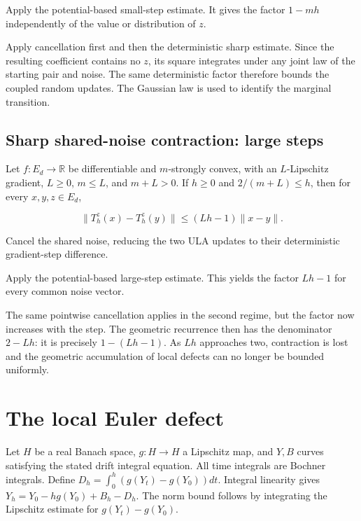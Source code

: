 \documentclass[11pt,a4paper]{report}
\begin{document}
Apply the potential-based small-step estimate. It gives the factor \(1-mh\) independently of the value or distribution of \(z\).



Apply cancellation first and then the deterministic sharp estimate. Since the resulting coefficient contains no \(z\), its square integrates under any joint law of the starting pair and noise. The same deterministic factor therefore bounds the coupled random updates. The Gaussian law is used to identify the marginal transition.

\subsection{\texorpdfstring{Sharp shared-noise contraction: large steps}{Sharp shared-noise contraction: large steps}}
\label{report-step-UnadjustedLangevin-SharpContraction-lean-11}


Let \(f:E_d\to\mathbb R\) be differentiable and \(m\)-strongly convex, with an \(L\)-Lipschitz gradient, \(L\ge0\), \(m\le L\), and \(m+L>0\). If \(h\ge0\) and \(2/(m+L)\le h\), then for every \(x,y,z\in E_d\),

\[\|T_h^z(x)-T_h^z(y)\|\le(Lh-1)\|x-y\|.\]

Cancel the shared noise, reducing the two ULA updates to their deterministic gradient-step difference.



Apply the potential-based large-step estimate. This yields the factor \(Lh-1\) for every common noise vector.



The same pointwise cancellation applies in the second regime, but the factor now increases with the step. The geometric recurrence then has the denominator \(2-Lh\): it is precisely \(1-(Lh-1)\). As \(Lh\) approaches two, contraction is lost and the geometric accumulation of local defects can no longer be bounded uniformly.

\section{\texorpdfstring{The local Euler defect}{The local Euler defect}}
\label{proof-module-UnadjustedLangevin-LocalError-lean}


Let \(H\) be a real Banach space, \(g:H\to H\) a Lipschitz map, and \(Y,B\) curves satisfying the stated drift integral equation. All time integrals are Bochner integrals. Define \(D_h=\int_0^h(g(Y_t)-g(Y_0))dt\). Integral linearity gives \(Y_h=Y_0-hg(Y_0)+B_h-D_h\). The norm bound follows by integrating the Lipschitz estimate for \(g(Y_t)-g(Y_0)\).
\end{document}
